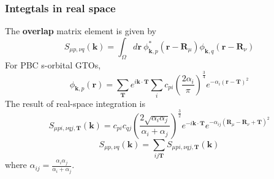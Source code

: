 \documentclass{article}
\begin{document}
        \subsubsection{Integtals in real space}
            The \textbf{overlap} matrix element is given by
            \begin{equation}
                S_{\mu p,\nu q}(\textbf{k}) = \int_{\Omega}d\textbf{r}\ \phi_{\textbf{k},p}^*(\textbf{r}-\textbf{R}_{\mu})\phi_{\textbf{k},q}(\textbf{r}-\textbf{R}_{\nu})
            \end{equation}
            For PBC s-orbital GTOs,
            $$ \phi_{\textbf{k},p}(\textbf{r}) = \sum_{\textbf{T}}e^{i\textbf{k}\cdot\textbf{T}}\sum_ic_{pi}\left(\frac{2\alpha_i}{\pi}\right)^{\frac{3}{4}}e^{-\alpha_i(\textbf{r}-\textbf{T})^2} $$
            The result of real-space integration is   
            \begin{equation}
                S_{\mu pi,\nu qj,\textbf{T}}(\textbf{k}) = c_{pi}c_{qj}(\frac{2\sqrt{\alpha_i\alpha_j}}{\alpha_i+\alpha_j})^{\frac{3}{2}}
                e^{-i\textbf{k}\cdot\textbf{T}}e^{-\alpha_{ij}(\textbf{R}_{\mu}-\textbf{R}_{\nu}+\textbf{T})^2}
            \end{equation}
            \begin{equation}
                S_{\mu p,\nu q}(\textbf{k}) = \sum_{ij\textbf{T}}S_{\mu pi,\nu qj,\textbf{T}}(\textbf{k})
            \end{equation}
            where $\alpha_{ij} = \frac{\alpha_i\alpha_j}{\alpha_i+\alpha_j}$.
\end{document}
